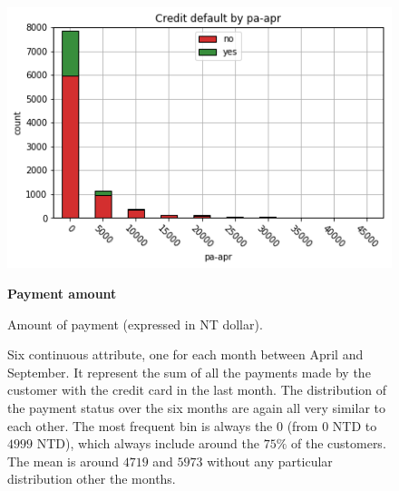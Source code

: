 \smallskip
\begin{figure}[h]
  \begin{minipage}[h]{.50\textwidth}
    \includegraphics[width=.95\textwidth]{img/ch2/payment_amount_1}
  \end{minipage}
  \begin{minipage}[h]{.50\textwidth}
        {\Large \textbf{Payment amount}}
        
        Amount of payment (expressed in NT dollar).
        
        Six continuous attribute, one for each month between April and September.
        It represent the sum of all the payments made by the customer with the credit card in the last month. The distribution of the payment status over the six months are again all very similar to each other. The most frequent bin is always the 0 (from $0$ NTD to $4999$ NTD), which always include around the $75\%$ of the customers. The mean is around $4719$ and $5973$ without any particular distribution other the months.
  \end{minipage}
\end{figure}
\smallskip
